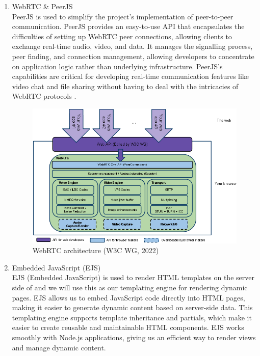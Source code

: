 \documentclass[a4paper,12pt]{article}  %
\begin{document}
\begin{enumerate}
      \item WebRTC \& PeerJS\\
      PeerJS is used to simplify the project's implementation of peer-to-peer communication. PeerJS provides an easy-to-use API that encapsulates the difficulties of setting up WebRTC peer connections, allowing clients to exchange real-time audio, video, and data. It manages the signalling process, peer finding, and connection management, allowing developers to concentrate on application logic rather than underlying infrastructure. PeerJS's capabilities are critical for developing real-time communication features like video chat and file sharing without having to deal with the intricacies of WebRTC protocols \cite{webrtc2024} \cite{peerjs2024}.\\
      \begin{figure}[H]
            \centering
            \includegraphics[width=1\textwidth]{figures/w3rtc.png}
            \caption{WebRTC architecture  (W3C WG, 2022)}
      \end{figure}

      \item Embedded JavaScript (EJS)\\
      EJS (Embedded JavaScript) is used to render HTML templates on the server side of and we will use this as our templating engine for rendering dynamic pages. EJS  allows us to embed JavaScript code directly into HTML pages, making it easier to generate dynamic content based on server-side data. This templating engine supports template inheritance and partials, which make it easier to create reusable and maintainable HTML components. EJS works smoothly with Node.js applications, giving us an efficient way to render views and manage dynamic content\cite{geeksforgeeks2024ejs}.\\


\end{enumerate}
\end{document}
